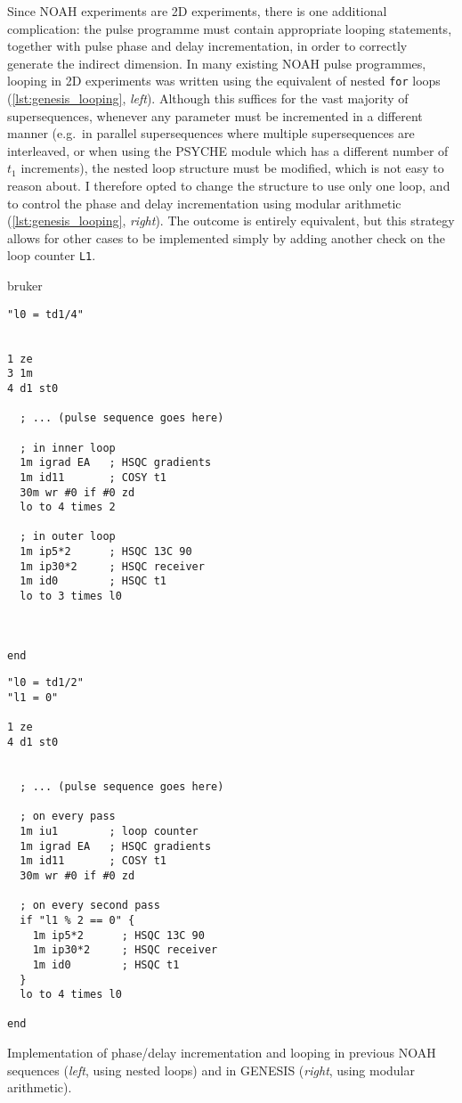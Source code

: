 Since NOAH experiments are 2D experiments, there is one additional complication: the pulse programme must contain appropriate looping statements, together with pulse phase and delay incrementation, in order to correctly generate the indirect dimension.
In many existing NOAH pulse programmes, looping in 2D experiments was written using the equivalent of nested \texttt{for} loops (\cref{lst:genesis_looping}, \textit{left}).
Although this suffices for the vast majority of supersequences, whenever any parameter must be incremented in a different manner (e.g.\ in parallel supersequences where multiple supersequences are interleaved, or when using the PSYCHE module which has a different number of $t_1$ increments), the nested loop structure must be modified, which is not easy to reason about.
I therefore opted to change the structure to use only one loop, and to control the phase and delay incrementation using modular arithmetic (\cref{lst:genesis_looping}, \textit{right}).
The outcome is entirely equivalent, but this strategy allows for other cases to be implemented simply by adding another check on the loop counter \texttt{L1}.

\begin{mylisting}[!ht] %
\begin{tcbmintedsbs}{bruker}
\begin{verbatim}
"l0 = td1/4"


1 ze
3 1m
4 d1 st0

  ; ... (pulse sequence goes here)

  ; in inner loop
  1m igrad EA   ; HSQC gradients
  1m id11       ; COSY t1
  30m wr #0 if #0 zd
  lo to 4 times 2

  ; in outer loop
  1m ip5*2      ; HSQC 13C 90
  1m ip30*2     ; HSQC receiver
  1m id0        ; HSQC t1
  lo to 3 times l0



end
\end{verbatim}
\tcblower
\begin{verbatim}
"l0 = td1/2"
"l1 = 0"

1 ze
4 d1 st0


  ; ... (pulse sequence goes here)

  ; on every pass
  1m iu1        ; loop counter
  1m igrad EA   ; HSQC gradients
  1m id11       ; COSY t1
  30m wr #0 if #0 zd

  ; on every second pass
  if "l1 % 2 == 0" {
    1m ip5*2      ; HSQC 13C 90
    1m ip30*2     ; HSQC receiver
    1m id0        ; HSQC t1
  }
  lo to 4 times l0

end
\end{verbatim}
\end{tcbmintedsbs}
    \caption[GENESIS implementation of looping]{Implementation of phase/delay incrementation and looping in previous NOAH sequences (\textit{left}, using nested loops) and in GENESIS (\textit{right}, using modular arithmetic).}
    \label{lst:genesis_looping}
\end{mylisting} %



